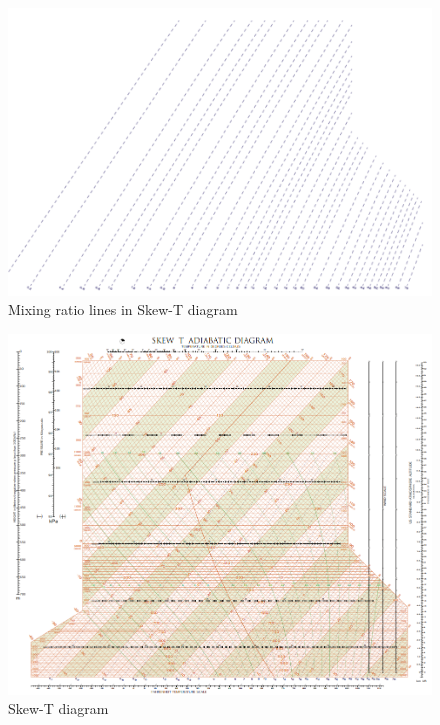 \documentclass[fleqn,10pt]{SelfArx} %
\begin{document}
\begin{figure}[ht]
    \centering
    \begin{minipage}[b]{0.48\textwidth}
        \centering
        \includegraphics[width=\textwidth]{Figures/Mixing-ratio-lines.png}
        \caption{Mixing ratio lines in Skew-T diagram}
    \end{minipage}
\end{figure}

\clearpage
\begin{figure}[ht]\centering
	\includegraphics[width=\linewidth]{Figures/skew_t.png}
        \caption{Skew-T diagram}
        \label{fig:Skew-T_diagram}
\end{figure}
\end{document}
